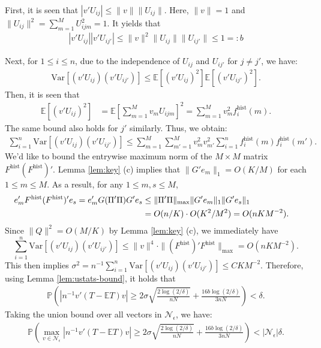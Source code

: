 \documentclass[preprint,11pt]{article}
\newcommand{\mbb}{\mathbb}
\newcommand{\Var}{\text{Var}}
\newcommand{\mcal}{\mathcal}
\numberwithin{equation}{section}
\begin{document}
First, it is seen that $|v'U_{ij}|\le \|v\|\|U_{ij}\|$. Here, $\|v\|=1$ and $\|U_{ij}\|^2=\sum_{m=1}^M U_{ijm}^2=1$. It yields that
\begin{align*}
    |v'U_{ij}||v'U_{ij'}|\le \|v\|^2\|U_{ij}\|\|U_{ij'}\|\le 1=:b
\end{align*}

Next, for $1\le i\le n$, due to the independence of $U_{ij}$ and $U_{ij'}$ for $j\ne j'$, we have:
\begin{align*}
    \Var\left[(v'U_{ij})(v'U_{ij'})\right]\le \mbb{E}\left[(v'U_{ij})^2\right]\mbb{E}\left[(v'U_{ij'})^2\right].
\end{align*}
Then, it is seen that
\begin{align*}
    \mbb{E}\left[(v'U_{ij})^2\right]&=\mbb{E}\left[\sum_{m=1}^M v_mU_{ijm}\right]^2=\sum_{m=1}^M v_{m}^2f_i^{\text{hist}}(m).
\end{align*}
The same bound also holds for $j'$ similarly. Thus, we obtain:
\begin{align*}
    \sum_{i=1}^n\Var\left[(v'U_{ij})(v'U_{ij'})\right]\le  \sum_{m=1}^M \sum_{m'=1}^Mv_{m}^2v_{m'}^2\sum_{i=1}^nf_i^{\text{hist}}(m) f_i^{\text{hist}}(m').
\end{align*}
We'd like to bound the entrywise maximum norm of the $M\times M$ matrix $F^{\text{hist}}(F^{\text{hist}})'$. Lemma \ref{lem:key} (c) implies that $\|G'e_m\|_1=O(K/M)$ for each $1\leq m\leq M$. As a result, for any $1\leq m,s\leq M$, 
\begin{align*}
e_m'F^{\text{hist}}(F^{\text{hist}})'e_{s} = e_m'G(\Pi'\Pi) G'e_{s}& \leq \|\Pi'\Pi\|_{\max} \|G' e_m\|_1 \|G'e_s\|_1 \cr
&= O(n/K)\cdot O(K^2/M^2)=  O(nKM^{-2}).  
\end{align*}
Since $\|Q\|^2=O(M/K)$ by Lemma \ref{lem:key} (c), we immediately have 
\[
\sum_{i=1}^n\Var\left[(v'U_{ij})(v'U_{ij'})\right]\leq \|v\|^4\cdot \|(F^{\text{hist}})'F^{\text{hist}}\|_{\max}= O(nKM^{-2}). 
\]
This then implies $\sigma^2=n^{-1}\sum_{i=1}^n\Var\left[(v'U_{ij})(v'U_{ij'})\right]\le CKM^{-2}$. Therefore, using Lemma \ref{lem:ustats-bound}, it holds that 
\begin{align*}
    \mbb{P}\left(|n^{-1}v'(T-\mathbb{E}T)v|\ge 2\sigma\sqrt{\frac{2\log(2/\delta)}{nN}}+\frac{16b\log(2/\delta)}{3nN}\right)< \delta.
\end{align*}
Taking the union bound over all vectors in $\mcal{N}_{\epsilon}$, we have:
\begin{align*}
    \mbb{P}\left(\max_{v\in\mcal{N}_\epsilon}|n^{-1}v'(T-\mathbb{E}T)v|\ge 2\sigma\sqrt{\frac{2\log(2/\delta)}{nN}}+\frac{16b\log(2/\delta)}{3nN}\right)< |\mcal{N}_{\epsilon}|\delta.
\end{align*}
\end{document}
